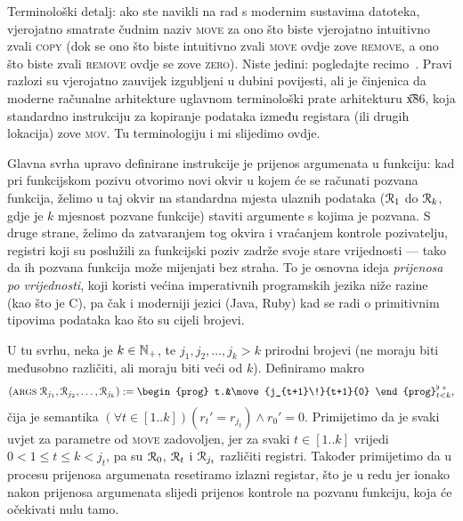 \begin{napomena}
Terminološki detalj: ako ste navikli na rad s modernim sustavima datoteka, vjerojatno smatrate čudnim naziv \textsc{move} za ono što biste vjerojatno intuitivno zvali \textsc{copy} (dok se ono što biste intuitivno zvali \textsc{move} ovdje zove \textsc{remove}, a ono što biste zvali \textsc{remove} ovdje se zove \textsc{zero}). Niste jedini: pogledajte recimo~\cite{url:movecopy}. Pravi razlozi su vjerojatno zauvijek izgubljeni u dubini povijesti, ali je činjenica da moderne računalne arhitekture uglavnom terminološki prate arhitekturu \t{x86}, koja standardno instrukciju za kopiranje podataka između registara (ili drugih lokacija) zove \textsc{mov}. Tu terminologiju i mi slijedimo ovdje.
\end{napomena}

Glavna svrha upravo definirane instrukcije je prijenos argumenata u funkciju: kad pri funkcijskom pozivu otvorimo novi okvir u kojem će se računati pozvana funkcija, želimo u taj okvir na standardna mjesta ulaznih podataka ($\mathcal R_{1}$ do $\mathcal R_{k}$, gdje je $k$ mjesnost pozvane funkcije) staviti argumente s kojima je pozvana. S druge strane, želimo da zatvaranjem tog okvira i vraćanjem kontrole pozivatelju, registri koji su poslužili za funkcijski poziv zadrže svoje stare vrijednosti --- tako da ih pozvana funkcija može mijenjati bez straha. To je osnovna ideja \emph{prijenosa po vrijednosti}, koji koristi većina imperativnih programskih jezika niže razine (kao što je C), pa čak i moderniji jezici (Java, Ruby) kad se radi o primitivnim tipovima podataka kao što su cijeli brojevi.

U tu svrhu, neka je $k\in{\mathbb N}_+$, te $j_1,j_2,\dotsc,j_k>k$ prirodni brojevi (ne moraju biti međusobno različiti, ali moraju biti veći od $k$). Definiramo makro
\begin{equation}
    (\textsc{args} \;\reg{j_1},\reg{j_2},\dotsc,\reg{j_k}):=\begin{prog} t.&\move{j_{t+1}\!}{t+1}{0}
    \end{prog}^{\flat\;*}_{t<k}\text,
\end{equation}
čija je semantika $(\forall t\in[1..k])(r_t'=r_{j_t})\land r_0'=0$. Primijetimo da je svaki uvjet za parametre od \textsc{move} zadovoljen, jer za svaki $t\in[1..k]$ vrijedi $0<1\le t\le k<j_t$, pa su $\mathcal R_{0}$, $\mathcal R_{t}$ i $\mathcal R_{j_t}$ različiti registri. Također primijetimo da u procesu prijenosa argumenata resetiramo izlazni registar, što je u redu jer ionako nakon prijenosa argumenata slijedi prijenos kontrole na pozvanu funkciju, koja će očekivati nulu tamo.

